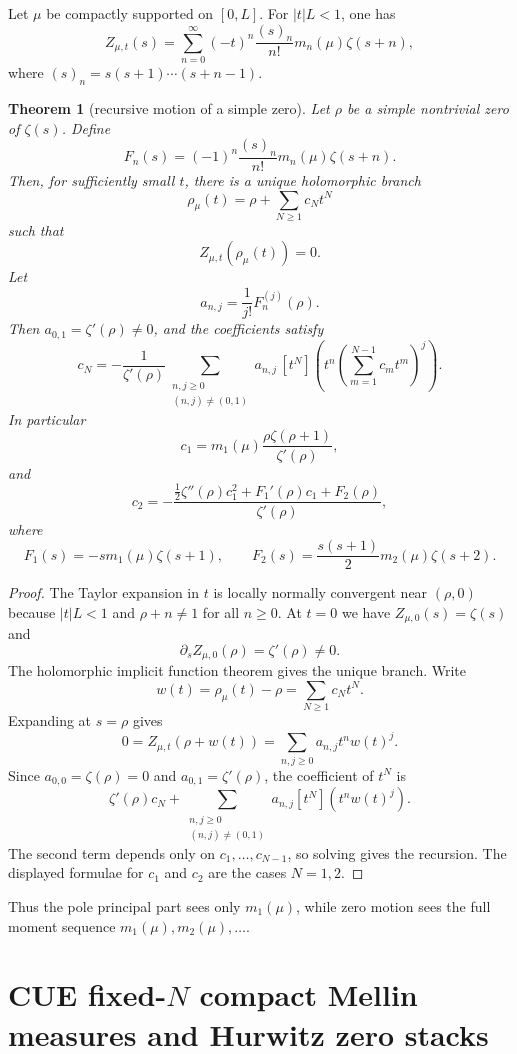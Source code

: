 \documentclass[11pt]{article}
\newtheorem{theorem}{Theorem}[section]
\begin{document}
Let $\mu$ be compactly supported on $[0,L]$.  For $|t|L<1$, one has
\[
Z_{\mu,t}(s)=\sum_{n=0}^\infty (-t)^n\frac{(s)_n}{n!}m_n(\mu)\zeta(s+n),
\]
where $(s)_n=s(s+1)\cdots(s+n-1)$.

\begin{theorem}[recursive motion of a simple zero]
Let $\rho$ be a simple nontrivial zero of $\zeta(s)$.  Define
\[
F_n(s)=(-1)^n\frac{(s)_n}{n!}m_n(\mu)\zeta(s+n).
\]
Then, for sufficiently small $t$, there is a unique holomorphic branch
\[
\rho_\mu(t)=\rho+\sum_{N\ge1}c_Nt^N
\]
such that
\[
Z_{\mu,t}(\rho_\mu(t))=0.
\]
Let
\[
a_{n,j}=\frac1{j!}F_n^{(j)}(\rho).
\]
Then $a_{0,1}=\zeta'(\rho)\ne0$, and the coefficients satisfy
\[
c_N=-\frac1{\zeta'(\rho)}
\sum_{\substack{n,j\ge0\\(n,j)\ne(0,1)}}
 a_{n,j}\,[t^N]\left(t^n\left(\sum_{m=1}^{N-1}c_mt^m\right)^j\right).
\]
In particular
\[
c_1=m_1(\mu)\frac{\rho\zeta(\rho+1)}{\zeta'(\rho)},
\]
and
\[
c_2=-\frac{\frac12\zeta''(\rho)c_1^2+F_1'(\rho)c_1+F_2(\rho)}{\zeta'(\rho)},
\]
where
\[
F_1(s)=-s m_1(\mu)\zeta(s+1),
\qquad
F_2(s)=\frac{s(s+1)}2m_2(\mu)\zeta(s+2).
\]
\end{theorem}

\begin{proof}
The Taylor expansion in $t$ is locally normally convergent near $(\rho,0)$ because
$|t|L<1$ and $\rho+n\ne1$ for all $n\ge0$.  At $t=0$ we have
$Z_{\mu,0}(s)=\zeta(s)$ and
\[
\partial_sZ_{\mu,0}(\rho)=\zeta'(\rho)\ne0.
\]
The holomorphic implicit function theorem gives the unique branch.
Write
\[
w(t)=\rho_\mu(t)-\rho=\sum_{N\ge1}c_Nt^N.
\]
Expanding at $s=\rho$ gives
\[
0=Z_{\mu,t}(\rho+w(t))=\sum_{n,j\ge0}a_{n,j}t^n w(t)^j.
\]
Since $a_{0,0}=\zeta(\rho)=0$ and $a_{0,1}=\zeta'(\rho)$, the coefficient of $t^N$ is
\[
\zeta'(\rho)c_N+
\sum_{\substack{n,j\ge0\\(n,j)\ne(0,1)}}
a_{n,j}[t^N](t^nw(t)^j).
\]
The second term depends only on $c_1,\dots,c_{N-1}$, so solving gives the
recursion.  The displayed formulae for $c_1$ and $c_2$ are the cases $N=1,2$.
\end{proof}

Thus the pole principal part sees only $m_1(\mu)$, while zero motion sees the full
moment sequence $m_1(\mu),m_2(\mu),\dots$.

\section{CUE fixed-$N$ compact Mellin measures and Hurwitz zero stacks}
\end{document}
